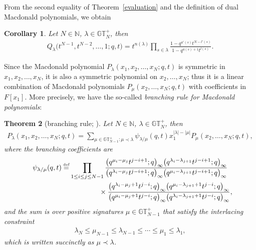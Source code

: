 \documentclass[pdftex]{sigma}
\numberwithin{equation}{section}
\newcommand\myeq{\mathrel{\stackrel{\makebox[0pt]{\mbox{\normalfont\tiny def}}}{=}}}
\newtheorem{thm}{Theorem}[section]
\newtheorem{cor}[thm]{Corollary}
\newcommand{\N}{\mathbb{N}}
\newcommand{\GTp}{\mathbb{GT}^+}
\begin{document}
From the second equality of Theorem~\ref{evaluation} and the def\/inition of dual Macdonald polynomials, we obtain

\begin{cor}\label{evaluationcor}
Let $N\in\N$, $\lambda\in\GTp_N$, then
\begin{gather*}
Q_{\lambda}\big(t^{N-1}, t^{N-2}, \dots, 1; q, t\big) = t^{n(\lambda)}\prod_{s\in\lambda}{\frac{1 - q^{a'(s)}t^{N - l'(s)}}{1 - q^{a(s)+1}t^{l(s)}}}.
\end{gather*}
\end{cor}

Since the Macdonald polynomial $P_{\lambda}(x_1, x_2, \dots, x_N; q, t)$ is symmetric in $x_1, x_2, \dots, x_N$, it is also a symmetric polynomial on $x_2, \dots, x_N$; thus it is a linear combination of Macdonald polynomials $P_{\mu}(x_2, \dots, x_N; q, t)$ with coef\/f\/icients in $F[x_1]$. More precisely, we have the so-called \textit{branching rule for Macdonald polynomials}:

\begin{thm}[{branching rule; \cite[Chapter~VI, equation~(7.13$'$), Example~2(b) on p.~342]{M2}}]\label{branchingmacdonald}
Let $N\in\N$, $\lambda\in\GTp_N$, then
\begin{gather*}
P_{\lambda}(x_1, x_2, \dots, x_N; q, t) = \sum_{\mu \in\GTp_{N-1}\colon \mu\prec\lambda}{\psi_{\lambda/\mu}(q, t)x_1^{|\lambda| - |\mu|}P_{\mu}(x_2, \dots, x_N; q, t)},
\end{gather*}
where the branching coefficients are
\begin{gather*}
\psi_{\lambda/\mu}(q, t) \myeq \prod_{1\leq i \leq j\leq N-1}\frac{\big(q^{\mu_i - \mu_j}t^{j-i+1}; q\big)_{\infty}\big(q^{\lambda_i - \lambda_{j+1}}t^{j-i+1}; q\big)_{\infty} }
{\big(q^{\lambda_i - \mu_j}t^{j-i+1}; q\big)_{\infty}\big(q^{\mu_i - \lambda_{j+1}}t^{j-i+1}; q\big)_{\infty} }\\
\hphantom{\psi_{\lambda/\mu}(q, t) \myeq \prod_{1\leq i \leq j\leq N-1}}{} \times \frac{\big(q^{\lambda_i - \mu_j+1}t^{j-i}; q\big)_{\infty}\big(q^{\mu_i - \lambda_{j+1} + 1}t^{j-i}; q\big)_{\infty}}{\big(q^{\mu_i - \mu_j+1}t^{j-i}; q\big)_{\infty}\big(q^{\lambda_i - \lambda_{j+1}+1}t^{j-i}; q\big)_{\infty}} ,
\end{gather*}
and the sum is over positive signatures $\mu\in\GTp_{N-1}$ that satisfy the interlacing constraint
\begin{gather*}
\lambda_N \leq \mu_{N-1} \leq \lambda_{N-1} \leq \cdots \leq \mu_1 \leq \lambda_1,
\end{gather*}
which is written succinctly as $\mu\prec\lambda$.
\end{thm}
\end{document}
